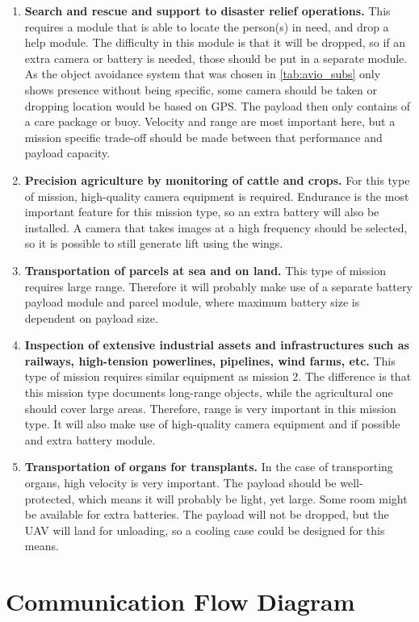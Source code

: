\begin{enumerate}
\item	\textbf{Search and rescue and support to disaster relief operations.} This requires a module that is able to locate the person(s) in need, and drop a help module. The difficulty in this module is that it will be dropped, so if an extra camera or battery is needed, those should be put in a separate module. As the object avoidance system that was chosen in \autoref{tab:avio_subs} only shows presence without being specific, some camera should be taken or dropping location would be based on GPS. The payload then only contains of a care package or buoy. Velocity and range are most important here, but a mission specific trade-off should be made between that performance and payload capacity.
\item	\textbf{Precision agriculture by monitoring of cattle and crops.} For this type of mission, high-quality camera equipment is required. Endurance is the most important feature for this mission type, so an extra battery will also be installed. A camera that takes images at a high frequency should be selected, so it is possible to still generate lift using the wings.
\item \textbf{Transportation of parcels at sea and on land.} This type of mission requires large range. Therefore it will probably make use of a separate battery payload module and parcel module, where maximum battery size is dependent on payload size.
\item \textbf{Inspection of extensive industrial assets and infrastructures such as railways, high-tension powerlines, pipelines, wind farms, etc.} This type of mission requires similar equipment as mission 2. The difference is that this mission type documents long-range objects, while the agricultural one should cover large areas. Therefore, range is very important in this mission type. It will also make use of high-quality camera equipment and if possible and extra battery module.
\item 	\textbf{Transportation of organs for transplants.} In the case of transporting organs, high velocity is very important. The payload should be well-protected, which means it will probably be light, yet large. Some room might be available for extra batteries. The payload will not be dropped, but the UAV will land for unloading, so a cooling case could be designed for this means.
\end{enumerate}


\section{Communication Flow Diagram}
\label{sec:comm_flow_diag}

